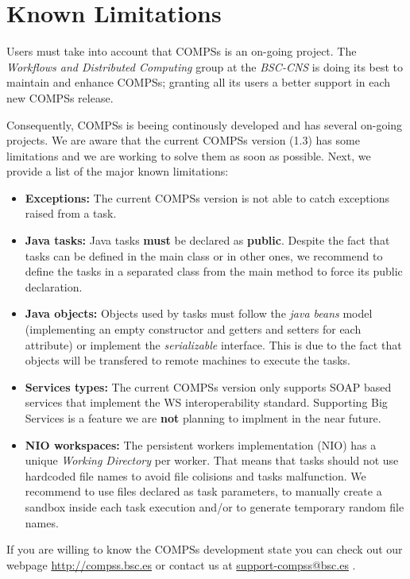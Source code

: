 \section{Known Limitations}
\label{sec:Known_Limitations}

Users must take into account that COMPSs is an on-going project. The \textit{Workflows and Distributed Computing} group 
at the \textit{BSC-CNS} is doing its best to maintain and enhance COMPSs; granting all its users a better support in
each new COMPSs release. 

Consequently, COMPSs is beeing continously developed and has several on-going projects. We are aware that the current COMPSs version
(1.3) has some limitations and we are working to solve them as soon as possible. Next, we provide a list of the major known
limitations: 
\begin{itemize}
 \item \textbf{Exceptions:} \newline The current COMPSs version is not able to catch exceptions raised from a task.
 
 \item \textbf{Java tasks:} \newline Java tasks \textbf{must} be declared as \textbf{public}. Despite the fact that tasks can be
 defined in the main class or in other ones, we recommend to define the tasks in a separated class from the main method to force
 its public declaration.
 
 \item \textbf{Java objects:} \newline Objects used by tasks must follow the \textit{java beans} model (implementing an empty 
 constructor and getters and setters for each attribute) or implement the \textit{serializable} interface. This is due to the 
 fact that objects will be transfered to remote machines to execute the tasks.
 
 \item \textbf{Services types:} \newline The current COMPSs version only supports SOAP based services that implement the WS interoperability
 standard. Supporting Big Services is a feature we are \textbf{not} planning to implment in the near future.
 
 \item \textbf{NIO workspaces:} \newline The persistent workers implementation (NIO) has a unique \textit{Working Directory} per 
 worker. That means that tasks should not use hardcoded file names to avoid file colisions and tasks malfunction. We recommend to
 use files declared as task parameters, to manually create a sandbox inside each task execution and/or to generate temporary 
 random file names. 
\end{itemize}

If you are willing to know the COMPSs development state you can check out our webpage \url{http://compss.bsc.es} or 
contact us at \url{support-compss@bsc.es} .
